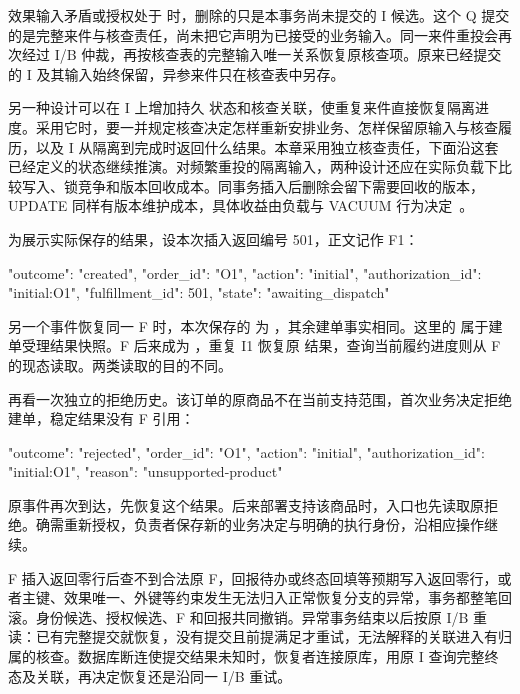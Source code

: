 效果输入矛盾或授权处于  时，删除的只是本事务尚未提交的 I 候选。这个 Q 提交的是完整来件与核查责任，尚未把它声明为已接受的业务输入。同一来件重投会再次经过 I/B 仲裁，再按核查表的完整输入唯一关系恢复原核查项。原来已经提交的 I 及其输入始终保留，异参来件只在核查表中另存。

另一种设计可以在 I 上增加持久  状态和核查关联，使重复来件直接恢复隔离进度。采用它时，要一并规定核查决定怎样重新安排业务、怎样保留原输入与核查履历，以及 I 从隔离到完成时返回什么结果。本章采用独立核查责任，下面沿这套已经定义的状态继续推演。对频繁重投的隔离输入，两种设计还应在实际负载下比较写入、锁竞争和版本回收成本。同事务插入后删除会留下需要回收的版本，UPDATE 同样有版本维护成本，具体收益由负载与 VACUUM 行为决定~\cite{pg}。

为展示实际保存的结果，设本次插入返回编号 501，正文记作 F1：

\begin{BookCode}
{
  "outcome": "created",
  "order_id": "O1",
  "action": "initial",
  "authorization_id": "initial:O1",
  "fulfillment_id": 501,
  "state": "awaiting_dispatch"
}
\end{BookCode}

另一个事件恢复同一 F 时，本次保存的  为 ，其余建单事实相同。这里的  属于建单受理结果快照。F 后来成为 ，重复 I1 恢复原  结果，查询当前履约进度则从 F 的现态读取。两类读取的目的不同。


\noindent\begin{minipage}{\linewidth}
再看一次独立的拒绝历史。该订单的原商品不在当前支持范围，首次业务决定拒绝建单，稳定结果没有 F 引用：

\begin{BookCode}
{
  "outcome": "rejected",
  "order_id": "O1",
  "action": "initial",
  "authorization_id": "initial:O1",
  "reason": "unsupported-product"
}
\end{BookCode}
\end{minipage}

原事件再次到达，先恢复这个结果。后来部署支持该商品时，入口也先读取原拒绝。确需重新授权，负责者保存新的业务决定与明确的执行身份，沿相应操作继续。

F 插入返回零行后查不到合法原 F，回报待办或终态回填等预期写入返回零行，或者主键、效果唯一、外键等约束发生无法归入正常恢复分支的异常，事务都整笔回滚。身份候选、授权候选、F 和回报共同撤销。异常事务结束以后按原 I/B 重读：已有完整提交就恢复，没有提交且前提满足才重试，无法解释的关联进入有归属的核查。数据库断连使提交结果未知时，恢复者连接原库，用原 I 查询完整终态及关联，再决定恢复还是沿同一 I/B 重试。

